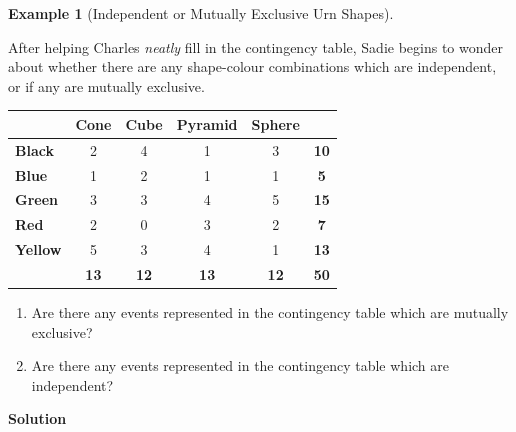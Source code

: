 \documentclass[
  letterpaper,
  DIV=11,
  numbers=noendperiod]{scrreprt}
\providecommand{\tightlist}{%
  \setlength{\itemsep}{0pt}\setlength{\parskip}{0pt}}\usepackage{longtable,booktabs,array}
\theoremstyle{definition}
\theoremstyle{definition}
\theoremstyle{definition}
\newtheorem{example}{Example}[chapter]
\theoremstyle{remark}
\begin{document}
\begin{example}[Independent or Mutually Exclusive Urn
Shapes]\protect\hypertarget{exm-contingency-table-mututally-exclusive}{}\label{exm-contingency-table-mututally-exclusive}

After helping Charles \emph{neatly} fill in the contingency table, Sadie
begins to wonder about whether there are any shape-colour combinations
which are independent, or if any are mutually exclusive.

\begin{tabular}{>{}l|c|c|c|c|>{}c}
\hline
  & Cone & Cube & Pyramid & Sphere & \\
\hline
\textbf{Black} & 2 & 4 & 1 & 3 & \textbf{10}\\
\hline
\textbf{Blue} & 1 & 2 & 1 & 1 & \textbf{5}\\
\hline
\textbf{Green} & 3 & 3 & 4 & 5 & \textbf{15}\\
\hline
\textbf{Red} & 2 & 0 & 3 & 2 & \textbf{7}\\
\hline
\textbf{Yellow} & 5 & 3 & 4 & 1 & \textbf{13}\\
\hline
\textbf{\textbf{}} & \textbf{13} & \textbf{12} & \textbf{13} & \textbf{12} & \textbf{\textbf{50}}\\
\hline
\end{tabular}

\begin{enumerate}
\def\labelenumi{\alph{enumi}.}
\tightlist
\item
  Are there any events represented in the contingency table which are
  mutually exclusive?
\item
  Are there any events represented in the contingency table which are
  independent?
\end{enumerate}

\begin{tcolorbox}[enhanced jigsaw, colback=white, breakable, rightrule=.15mm, leftrule=.75mm, toprule=.15mm, left=2mm, arc=.35mm, opacityback=0, bottomrule=.15mm]

\vspace{-3mm}\textbf{Solution}\vspace{3mm}


\end{tcolorbox}
\end{example}
\end{document}
